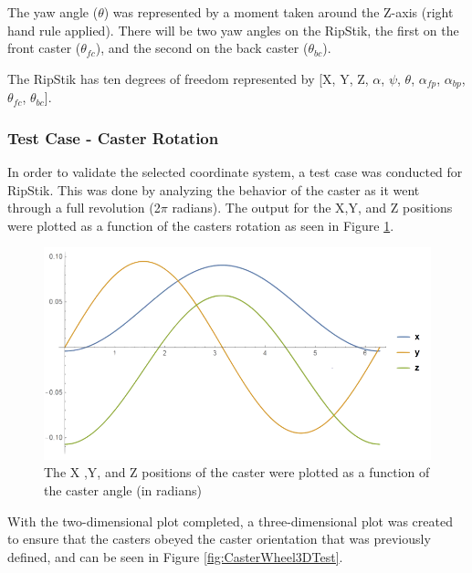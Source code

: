 \par
The yaw angle ($\theta$) was represented by a moment taken around the Z-axis (right hand rule applied). There will be two yaw angles on the RipStik, the first on the front caster ($\theta_{fc}$), and the second on the back caster ($\theta_{bc}$).

The RipStik has ten degrees of freedom represented by [X, Y, Z, $\alpha$, $\psi$, $\theta$, $\alpha_{fp}$, $\alpha_{bp}$, $\theta_{fc}$, $\theta_{bc}$].

\subsubsection{Test Case - Caster Rotation}

In order to validate the selected coordinate system, a test case was conducted for RipStik. This was done by analyzing the behavior of the caster as it went through a full revolution (2$\pi$ radians).
The output for the X,Y, and Z positions were plotted as a function of the casters rotation as seen in Figure \ref{fig:CasterWheel2DTest}.

\begin{figure}[!htb]
	\centering
	\includegraphics[width=\linewidth]{CasterWheel2DTest.png}
	\caption{The X ,Y, and Z positions of the caster were plotted as a function of the caster angle (in radians)}\label{fig:CasterWheel2DTest}
	\endminipage
\end{figure} 

With the two-dimensional plot completed, a three-dimensional plot was created to ensure that the casters obeyed the caster orientation that was previously defined, and can be seen in Figure \ref{fig:CasterWheel3DTest}.

